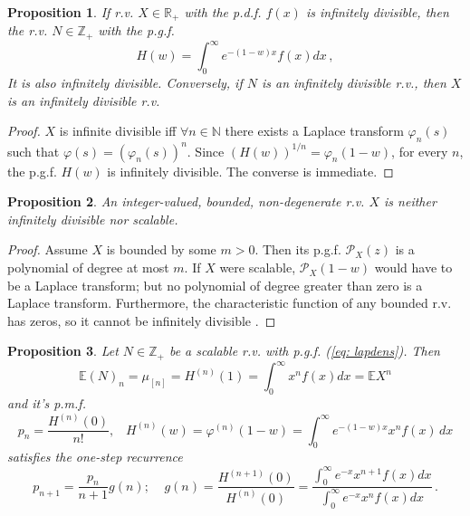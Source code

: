 \documentclass[a4paper,12pt]{amsart}
\newcommand{\E}{\mathbb{E}}
\newcommand{\N}{\mathbb{N}}
\newcommand{\Z}{\mathbb{Z}_{+}}
\newcommand{\R}{\mathbb{R}_{+}}
\newtheorem{Proposition}{Proposition}[section]
\theoremstyle{definition}
\theoremstyle{remark}
\begin{document}
\begin{Proposition}\label{cor:infd2}
If r.v. $X\in \R$ with the p.d.f. $f(x)$ is infinitely divisible, then the r.v. $N \in \Z$ with the p.g.f. 
 \begin{equation}
\label{eq: lapdens}   
H(w)=\int_0^\infty e^{-(1-w)x}f(x) dx \,,
\end{equation}
It is also infinitely divisible. Conversely, if $N$ is an infinitely divisible r.v., then $X$ is an infinitely divisible r.v.
\end{Proposition}
\begin{proof}
 $X$ is infinite divisible iff $\forall n\in \N$  there exists a Laplace transform $\varphi_n(s)$ such that $\varphi(s)=(\varphi_n(s))^n$. Since $(H(w))^{1/n}=\varphi_n(1-w)$, for every $n$, the p.g.f. $H(w)$ is infinitely divisible. The converse is immediate.
\end{proof}
\begin{Proposition}{\rm \cite{StvH2004}}
An integer-valued, bounded, non-degenerate r.v. $X$ is neither infinitely divisible nor scalable.
\end{Proposition}
\begin{proof}
Assume $X$ is bounded by some $m>0$.
Then its p.g.f. $\mathcal{P}_X(z)$ is a polynomial of degree at most $m$. If $X$ were scalable, $\mathcal{P}_X(1-w)$ would have to be a Laplace transform; but no polynomial of degree greater than zero is a Laplace transform. Furthermore, the characteristic function of any bounded r.v. has zeros, so it cannot be infinitely divisible \cite{Linnik}. 
\end{proof}


\begin{Proposition} \label{cor:g} {\rm \cite{Klebanov2023-xj}} 
Let $N \in \Z$ be a scalable r.v. with p.g.f. (\ref{eq: lapdens}). Then 
\begin{equation}\label{frac2mom}
 \E (N)_n =\mu_{[n]}=H^{(n)}(1) = \int_0^{\infty}x^n f(x) dx=\E X^n  \end{equation}
 and it's p.m.f.  
\begin{equation} \label{eq: lapder}
 p_n=\frac{H^{(n)}(0)}{n!},\;\;\;   H^{(n)}(w)= \varphi^{(n)}(1-w) =\int_0^{\infty } e^{-(1-w) x} x^n f(x) \, dx
\end{equation} 
satisfies the one-step recurrence 
\begin{equation}
\label{eq: gnkl}
p_{n+1}=\frac{p_n}{n+1}g(n);\;\;\;\; 
g(n) = \frac{H^{(n+1)}(0)}{H^{(n)}(0)}=\frac{\int_{0}^{\infty}e^{-x}x^{n+1}f(x) dx}{\int_{0}^{\infty}e^{-x}x^{n} f(x) dx}\,.
\end{equation}
\end{Proposition}
\end{document}

